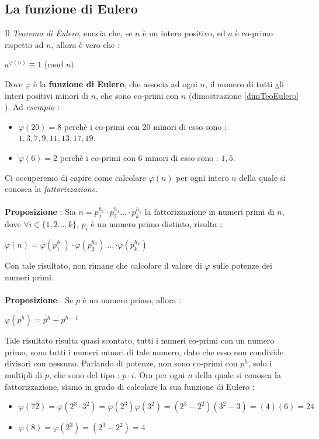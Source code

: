 \documentclass[12pt, letterpaper]{article}
\begin{document}
\subsection{La funzione di Eulero}\label{EulerFunc}
Il \textit{Teorema di Eulero}, enucia che, se \(n\) è un intero positivo, ed \(a\) è co-primo rispetto ad \(n\), allora
è vero che :
\begin{center}
    \(a^{\varphi(n)}\equiv 1\) (mod \(n)\)
\end{center} 
Dove \(\varphi\) è la \textbf{funzione di Eulero}, che associa ad ogni \(n\), il numero di tutti gli interi 
positivi minori di \(n\), che sono co-primi con \(n\) (dimostrazione \ref{dimTeoEulero} ). Ad \textit{esempio} :\begin{itemize}
    \item \(\varphi(20)=8\) perchè i co-primi con 20 minori di esso sono : \(1,3,7,9,11,13,17,19\).
    \item \(\varphi(6)=2\) perchè i co-primi con 6 minori di esso sono : \(1,5\).
\end{itemize}
Ci occuperemo di capire come calcolare \(\varphi(n)\) per ogni intero \(n\) della quale si conosca la \textit{fattorizzazione}.
\\\hphantom{.}\\\textbf{Proposizione} : Sia \(n=p_1^{h_1}\cdot p_2^{h_2}...\cdot p_k^{h_k}\) la fattorizzazione in numeri 
primi di \(n\), dove \(\forall i \in \{1,2...,k\}\), \(p_i\) è un numero primo distinto, risulta :\begin{center}
    \(
        \varphi(n)=  \varphi(p_1^{h_1})\cdot\varphi(p_2^{h_2})...,\cdot  \varphi(p_k^{h_k})
    \)
\end{center}
Con tale risultato, non rimane che calcolare il valore di \(\varphi\) sulle potenze dei numeri primi.
\\\hphantom{.}\\\textbf{Proposizione }: Se \(p\) è un numero primo, allora :\begin{center}
    \(
        \varphi(p^{h}) = p^h-p^{h-1} 
    \)
\end{center}
Tale risultato risulta quasi scontato, tutti i numeri co-primi con un numero primo, sono tutti i numeri minori 
di tale numero, dato che esso non condivide divisori con nessuno. Parlando di potenze, non sono co-primi con 
\(p^h\), solo i multipli di \(p\), che sono del tipo : \(p\cdot i\). Ora per ogni \(n\) della quale si conosca la fattorizzazione, 
siamo in grado di calcolare la sua funzione di Eulero : \begin{itemize}
    \item \(\varphi(72)=\varphi(2^3\cdot 3^2)=\varphi(2^3)\varphi(3^2)=(2^3-2^2)(3^2-3)=(4)(6)=24\)
    \item \(\varphi(8)=\varphi(2^3)=(2^3-2^2)=4\)
\end{itemize}
\end{document}
